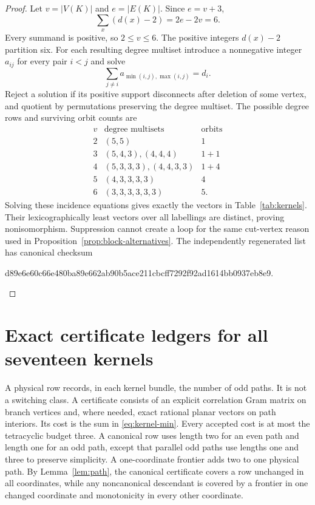 \documentclass[11pt]{article}
\theoremstyle{remark}
\begin{document}
\begin{proof}
Let $v=|V(K)|$ and $e=|E(K)|$.  Since $e=v+3$,
\begin{equation}\label{eq:degree-excess}
 \sum_x(d(x)-2)=2e-2v=6.
\end{equation}
Every summand is positive, so $2\leq v\leq6$.  The positive integers
$d(x)-2$ partition six.  For each resulting degree multiset introduce a
nonnegative integer $a_{ij}$ for every pair $i<j$ and solve
\[
 \sum_{j\ne i}a_{\min(i,j),\max(i,j)}=d_i.
\]
Reject a solution if its positive support disconnects after deletion of some
vertex, and quotient by permutations preserving the degree multiset.  The
possible degree rows and surviving orbit counts are
\[
\begin{array}{c|c|c}
v&\text{degree multisets}&\text{orbits}\\ \hline
2&(5,5)&1\\
3&(5,4,3),(4,4,4)&1+1\\
4&(5,3,3,3),(4,4,3,3)&1+4\\
5&(4,3,3,3,3)&4\\
6&(3,3,3,3,3,3)&5.
\end{array}
\]
Solving these incidence equations gives exactly the vectors in
Table~\ref{tab:kernels}.  Their lexicographically least vectors over all
labellings are distinct, proving nonisomorphism.  Suppression cannot create a
loop for the same cut-vertex reason used in Proposition~\ref{prop:block-alternatives}.
The independently regenerated list has canonical checksum
\begin{center}\ttfamily\small
d89e6e60c66e480ba89e662ab90b5ace211cbcff7292f92ad1614bb0937eb8e9.
\end{center}
\end{proof}

\section{Exact certificate ledgers for all seventeen kernels}

A physical row records, in each kernel bundle, the number of odd paths.  It is
not a switching class.  A certificate consists of an explicit correlation
Gram matrix on branch vertices and, where needed, exact rational planar
vectors on path interiors.  Its cost is the sum in \eqref{eq:kernel-min}.
Every accepted cost is at most the tetracyclic budget three.  A canonical row
uses length two for an even path and length one for an odd path, except that
parallel odd paths use lengths one and three to preserve simplicity.  A
one-coordinate frontier adds two to one physical path.  By
Lemma~\ref{lem:path}, the canonical certificate covers a row unchanged in all
coordinates, while any noncanonical descendant is covered by a frontier in
one changed coordinate and monotonicity in every other coordinate.
\end{document}
